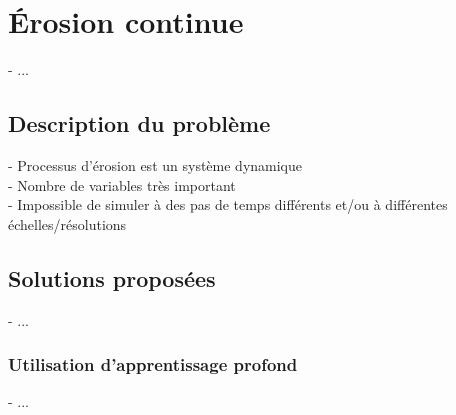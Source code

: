 \chapter{Érosion continue}
\minitoc

- ...

\section{Description du problème}
- Processus d'érosion est un système dynamique \\
- Nombre de variables très important \\
- Impossible de simuler à des pas de temps différents et/ou à différentes échelles/résolutions

\section{Solutions proposées}
- ...

\subsection{Utilisation d'apprentissage profond}
- ...
